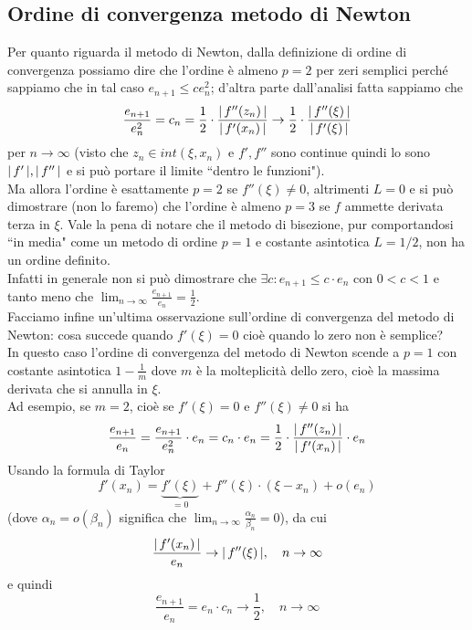 \documentclass[12pt]{article}
\DeclarePairedDelimiter{\abs}{\lvert}{\rvert}
\begin{document}
\subsection{Ordine di convergenza metodo di Newton}
Per quanto riguarda il metodo di Newton, dalla definizione di ordine di convergenza possiamo dire che l'ordine è almeno $p=2$ per zeri semplici perché sappiamo che in tal caso $e_{n+1} \leq ce^2_n$; d'altra parte dall'analisi fatta sappiamo che
\[\frac{e_{n+1}}{e_n^2} = c_n = \frac{1}{2} \cdot \frac{\abs{\,f''(z_n)\,}}{\abs{\,f'(x_n)\,}} \to \frac{1}{2} \cdot \frac{\abs{\,f''(\xi)\,}}{\abs{\,f'(\xi)\,}}\]
per $n \to \infty$ (visto che $z_n \in int(\xi,x_n)$ e $f', f''$ sono continue quindi lo sono $\abs{\,f'\,}, \abs{\,f''\,}$ e si può portare il limite ``dentro le funzioni").\\
Ma allora l'ordine è esattamente $p=2$ se $f''(\xi) \neq 0$, altrimenti $L=0$ e si può dimostrare (non lo faremo) che l'ordine è almeno $p=3$ se $f$ ammette derivata terza in $\xi$.
\newline \newline
Vale la pena di notare che il metodo di bisezione, pur comportandosi ``in media" come un metodo di ordine $p=1$ e costante asintotica $L=1/2$, non ha un ordine definito.\\
Infatti in generale non si può dimostrare che $\exists c: e_{n+1} \leq c\cdot e_n$ con $0<c<1$ e tanto meno che $\lim_{n\to \infty} \frac{e_{n+1}}{e_n} = \frac{1}{2}$.\\
Facciamo infine un'ultima osservazione sull'ordine di convergenza del metodo di Newton: cosa succede quando  $f'(\xi) = 0$ cioè quando lo zero non è semplice?\\
In questo caso l'ordine di convergenza del metodo di Newton scende a $p=1$ con costante asintotica $1-\frac{1}{m}$ dove $m$ è la molteplicità dello zero, cioè la massima derivata che si annulla in $\xi$.\\
Ad esempio, se $m=2$, cioè se $f'(\xi) = 0$ e $f''(\xi) \neq 0$ si ha
\[\frac{e_{n+1}}{e_n} = \frac{e_{n+1}}{e_n^2} \cdot e_n = c_n \cdot e_n = \frac{1}{2} \cdot \frac{\abs{\,f''(z_n)\,}}{\abs{\,f'(x_n)\,}} \cdot e_n\]
Usando la formula di Taylor
\[ f'(x_n)=\underbrace{f'(\xi)}_{=0} + f''(\xi)\cdot (\xi - x_n)+o(e_n) \]
(dove $\alpha_n = o(\beta_n)$ significa che $\lim_{n \to \infty} \frac{\alpha_n}{\beta_n} = 0$), da cui
\[\frac{\abs{\,f'(x_n)\,}}{e_n} \to \abs{\,f''(\xi)\,}, \quad n \to \infty\]
e quindi
\[ \frac{e_{n+1}}{e_n} = e_n \cdot c_n \to \frac{1}{2}, \quad n \to \infty \]
\end{document}
